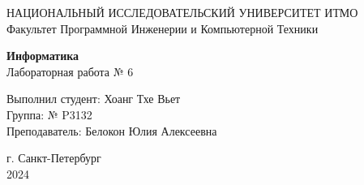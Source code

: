 \pagestyle{fancy}  
\begin{center}
    \Large НАЦИОНАЛЬНЫЙ ИССЛЕДОВАТЕЛЬСКИЙ УНИВЕРСИТЕТ ИТМО \\
    \Large Факультет Программной Инженерии и Компьютерной Техники
\end{center}
\vspace{200pt}
\begin{center}
\textbf{Информатика} \\
\Large Лабораторная работа № 6 \\ 
\end{center}
\vspace{70pt}
\raggedleft
Выполнил студент: Хоанг Тхе Вьет \\
Группа: № P3132 \\
Преподаватель: Белокон Юлия Алексеевна \\ 
\vspace{200pt}
\begin{center}
г. Санкт-Петербург \\
2024
\end{center}
